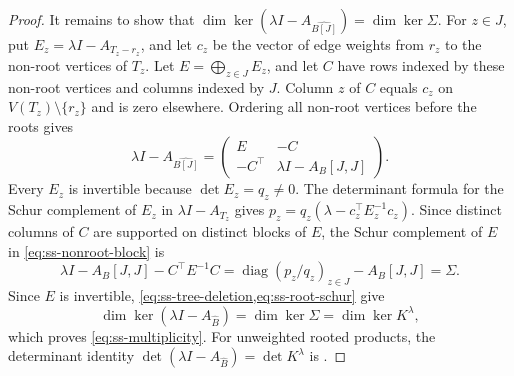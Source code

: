 \documentclass[10pt,a4paper]{article}
\theoremstyle{plain}
\theoremstyle{definition}
\DeclareMathOperator{\diag}{diag}
\begin{document}
\begin{proof}
It remains to show that
$\dim\ker(\lambda I-A_{\widehat{B[J]}})=\dim\ker \Sigma$.
For $z\in J$, put $E_z=\lambda I-A_{T_z-r_z}$, and let
$c_z$ be the vector of edge weights from $r_z$ to the non-root vertices
of $T_z$.
Let $E=\bigoplus_{z\in J}E_z$, and let $C$ have rows indexed by these
non-root vertices and columns indexed by $J$.
Column $z$ of $C$ equals $c_z$ on $V(T_z)\setminus\{r_z\}$ and is
zero elsewhere.
Ordering all non-root vertices before the roots gives
\begin{equation}\label{eq:ss-nonroot-block}
 \lambda I-A_{\widehat{B[J]}}=
 \begin{pmatrix}E&-C\\-C^{\top}&\lambda I-A_{B}[J,J]\end{pmatrix}.
\end{equation}
Every $E_z$ is invertible because $\det E_z=q_z\ne0$.
The determinant formula for the Schur complement of $E_z$ in
$\lambda I-A_{T_z}$ gives
$p_z=q_z(\lambda-c_z^{\top}E_z^{-1}c_z)$.
Since distinct columns of $C$ are supported on distinct blocks of $E$,
the Schur complement of $E$ in \cref{eq:ss-nonroot-block} is
\begin{equation}\label{eq:ss-root-schur}
 \lambda I-A_{B}[J,J]-C^{\top}E^{-1}C
 =\diag(p_z/q_z)_{z\in J}-A_{B}[J,J]=\Sigma.
\end{equation}
Since $E$ is invertible, \cref{eq:ss-tree-deletion,eq:ss-root-schur} give
\begin{equation}\label{eq:ss-kernel-reduction}
 \dim\ker(\lambda I-A_{\widehat B})
 =\dim\ker \Sigma
 =\dim\ker K^\lambda,
\end{equation}
which proves \cref{eq:ss-multiplicity}.
For unweighted rooted products, the determinant identity
$\det(\lambda I-A_{\widehat B})=\det K^\lambda$
is \cite[Theorem~2.1]{GodsilMcKay1978}.
\end{proof}
\end{document}
